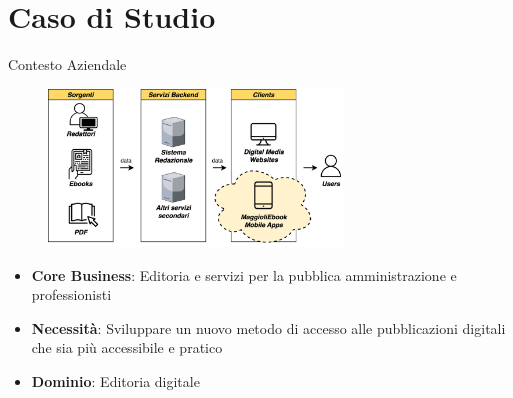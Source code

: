 
\section{Caso di Studio}

\begin{frame}{Contesto Aziendale}
    \begin{figure}[H]
        \includegraphics[width=0.7\textwidth]{img/contesto-aziendale.png}
    \end{figure}
    \begin{itemize}
        \item \textbf{Core Business}: Editoria e servizi per la pubblica amministrazione e professionisti
        \item \textbf{Necessità}: Sviluppare un nuovo metodo di accesso alle pubblicazioni digitali che sia più accessibile e pratico
        \item \textbf{Dominio}: Editoria digitale
    \end{itemize}
\end{frame}

